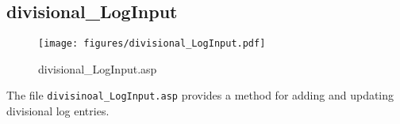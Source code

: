 \subsection{divisional\_LogInput}
\begin{figure}[htb]
    \begin{center}
        \texttt{[image: figures/divisional\_LogInput.pdf]}
    \end{center}
    \caption{divisional\_LogInput.asp}
    \label{fig:divisional_LogInput}
\end{figure}

The file \verb|divisinoal_LogInput.asp| provides a method for adding and
updating divisional log entries.
